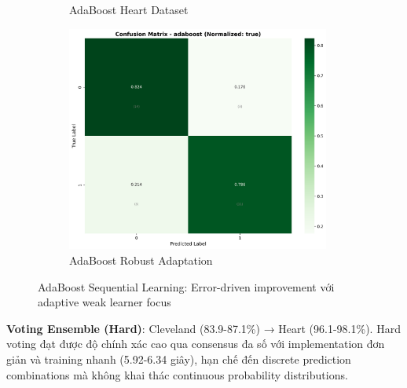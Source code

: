 \begin{figure}[H]
\begin{subfigure}[b]{0.31\textwidth}
\caption{AdaBoost Heart Dataset}
\label{fig:ada_heart_performance}
\end{subfigure}
\hfill
\begin{subfigure}[b]{0.31\textwidth}
\centering
\includegraphics[width=0.95\textwidth]{Result/cleveland_dataset/confusion_matrices/adaboost_numeric_dataset_RobustScaler.png}
\caption{AdaBoost Robust Adaptation}
\label{fig:ada_robust_performance}
\end{subfigure}
\caption{AdaBoost Sequential Learning: Error-driven improvement với adaptive weak learner focus}
\label{fig:adaboost_analysis_complete}
\end{figure}

\textbf{Voting Ensemble (Hard)}: Cleveland (83.9-87.1\%) → Heart (96.1-98.1\%). Hard voting đạt được độ chính xác cao qua consensus đa số với implementation đơn giản và training nhanh (5.92-6.34 giây), hạn chế đến discrete prediction combinations mà không khai thác continuous probability distributions.

